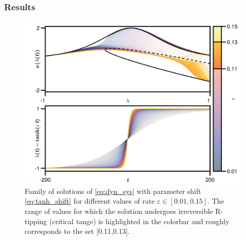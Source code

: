 \documentclass[../main.tex]{subfiles}
\begin{document}
\subsubsection{Results}\label{subsubsec:results_tanh_shift}

\begin{figure}[H]
    \centering 
    \includegraphics[keepaspectratio, width=\textwidth]{../figures/rate_sweep.png}
    \caption{Family of solutions of \eqref{eq:dyn_sys} with parameter shift \eqref{eq:tanh_shift} for different values of rate $\varepsilon\in[0.01,0.15]$. 
    The range of values for which the solution undergoes irreversible R-tipping (critical tange) is highlighted in the colorbar and roughly corresponds to the set [0.11,0.13].}
    \label{fig:rate_sweep}
\end{figure}
\end{document}
